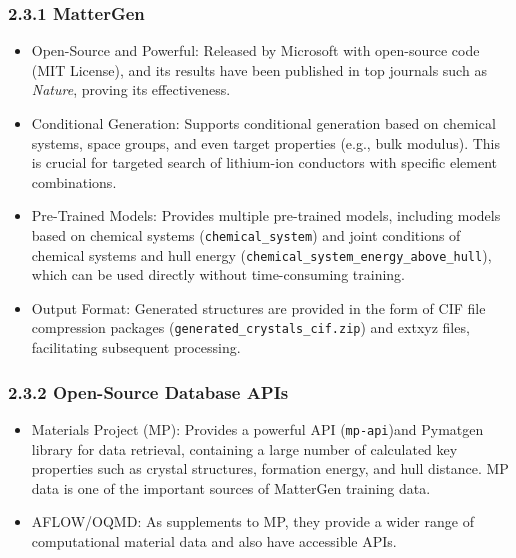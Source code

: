 \documentclass[letterpaper]{article} %
\begin{document}
\subsubsection{2.3.1 MatterGen}
\begin{itemize}
    \item Open-Source and Powerful: Released by Microsoft with open-source code (MIT License), and its results have been published in top journals such as \textit{Nature}, proving its effectiveness.
    \item Conditional Generation: Supports conditional generation based on chemical systems, space groups, and even target properties (e.g., bulk modulus). This is crucial for targeted search of lithium-ion conductors with specific element combinations.
    \item Pre-Trained Models: Provides multiple pre-trained models, including models based on chemical systems (\texttt{chemical\_system}) and joint conditions of chemical systems and hull energy (\texttt{chemical\_system\_energy\_above\_hull}), which can be used directly without time-consuming training.
    \item Output Format: Generated structures are provided in the form of CIF file compression packages (\texttt{generated\_crystals\_cif.zip}) and extxyz files, facilitating subsequent processing.
\end{itemize}

\subsubsection{2.3.2 Open-Source Database APIs}
\begin{itemize}
    \item Materials Project (MP): Provides a powerful API (\texttt{mp-api})and Pymatgen library for data retrieval, containing a large number of calculated key properties such as crystal structures, formation energy, and hull distance. MP data is one of the important sources of MatterGen training data.
    \item AFLOW/OQMD: As supplements to MP, they provide a wider range of computational material data and also have accessible APIs.
\end{itemize}
\end{document}
